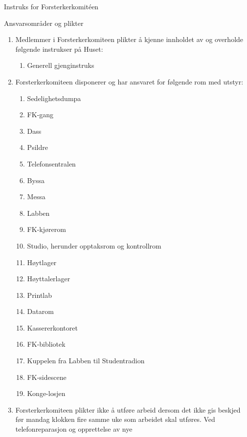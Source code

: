 \documentclass[../fsbok.tex]{subfiles}
\begin{document}
\begin{instruks*}{Instruks for Forsterkerkomit\'een}
    \begin{instruksledd}{Ansvarsområder og plikter}
        \begin{enumerate}
            \item Medlemmer i Forsterkerkomiteen plikter å kjenne innholdet av og overholde følgende
                instrukser på Huset:
                \begin{enumerate}
                    \item Generell gjenginstruks
                \end{enumerate}
            \item Forsterkerkomiteen disponerer og har ansvaret for følgende rom med utstyr:
                \begin{enumerate}
                    \item Sedelighetsdumpa
                     \item FK-gang
                    \item Dass
                    \item Psildre
                    \item Telefonsentralen
                    \item Byssa
                    \item Messa
                    \item Labben
                    \item FK-kjørerom
                    \item Studio, herunder opptaksrom og kontrollrom
                    \item Høytlager
                    \item Høyttalerlager
                    \item Printlab
                    \item Datarom
                    \item Kassererkontoret
                    \item FK-bibliotek
                    \item Kuppelen fra Labben til Studentradion
                    \item FK-sidescene
                    \item Konge-losjen
                \end{enumerate}
            \item Forsterkerkomiteen plikter ikke å utføre arbeid dersom det ikke gis beskjed
                før mandag klokken fire samme
                uke som arbeidet skal utføres. Ved telefonreparasjon og opprettelse av nye

\end{enumerate}
\end{instruksledd}
\end{instruks*}
\end{document}
